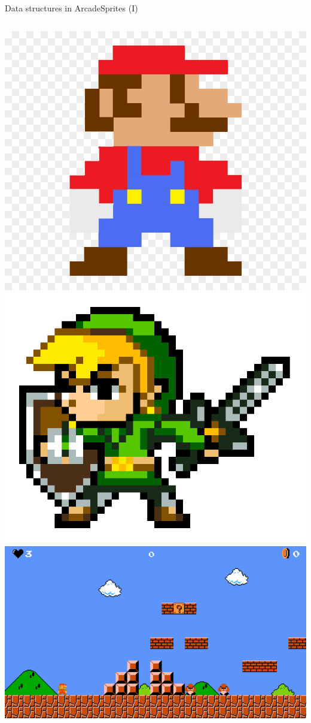 \documentclass[10pt,compress]{beamer} %
\begin{document}
{\begin{frame}{Data structures in Arcade}{Sprites (I)}
    \begin{columns}
			\includegraphics[width=\linewidth]{figs/mario.jpg}\\
			\includegraphics[width=\linewidth]{figs/zelda.png}\\
			\includegraphics[width=\linewidth]{figs/mario-screenshot.png}

\end{columns}
\end{frame}}
\end{document}
